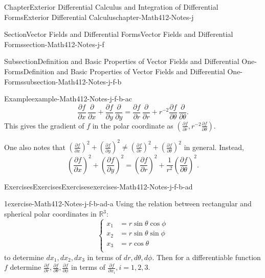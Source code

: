 \documentclass[oneside,10pt,]{book}
\numberwithin{equation}{section}
\newcommand{\bbR}{\mathbb{R}}
\newcommand{\amp}{&}
\begin{document}
\begin{chapterptx}{Chapter}{Exterior Differential Calculus and Integration of Differential Forms}{}{Exterior Differential Calculus}{}{}{chapter-Math412-Notes-j}
\begin{sectionptx}{Section}{Vector Fields and Differential Forms}{}{Vector Fields and Differential Forms}{}{}{section-Math412-Notes-j-f}
\begin{subsectionptx}{Subsection}{Definition and Basic Properties of Vector Fields and Differential One-Forms}{}{Definition and Basic Properties of Vector Fields and Differential One-Forms}{}{}{subsection-Math412-Notes-j-f-b}
\begin{example}{Example}{}{example-Math412-Notes-j-f-b-ac}
\begin{equation*}
\frac{\partial f}{\partial x}\, \frac{\partial }{\partial x} + \frac{\partial f}{\partial y}\, \frac{\partial }{\partial y}
= \frac{\partial f}{\partial r}\, \frac{\partial }{\partial r} + r^{-2} \frac{\partial f}{\partial \theta}\, 
\frac{\partial }{\partial \theta}.
\end{equation*}
This gives the gradient of \(f\) in the polar coordinate as \((\frac{\partial f}{\partial r},  r^{-2} \frac{\partial f}{\partial \theta})\).%
\par
One also notes that \(\left(\frac{\partial f}{\partial x}\right)^{2}+\left(\frac{\partial f}{\partial y}\right)^{2}
\ne \left(\frac{\partial f}{\partial r}\right)^{2}+\left(\frac{\partial f}{\partial \theta}\right)^{2}\) in general. Instead,%
\begin{equation*}
\left(\frac{\partial f}{\partial x}\right)^{2}+\left(\frac{\partial f}{\partial y}\right)^{2}
= \left(\frac{\partial f}{\partial r}\right)^{2}+\frac{1}{r^{2}}\left(\frac{\partial f}{\partial \theta}\right)^{2}\text{.}
\end{equation*}
%
\end{example}
%
%
\typeout{************************************************}
\typeout{************************************************}
%
\begin{exercises-subsubsection-numberless}{Exercises}{Exercises}{}{Exercises}{}{}{exercises-Math412-Notes-j-f-b-ad}
\begin{divisionexercise}{1}{}{}{exercise-Math412-Notes-j-f-b-ad-a}%
Using the relation between rectangular and spherical polar coordinates in \(\bbR^{3}\):%
\begin{equation*}
\begin{cases} x_{1} \amp = r\sin\theta\cos\phi \\
x_{2} \amp = r \sin\theta\sin\phi \\
x_{3} \amp = r \cos\theta\\
\end{cases}
\end{equation*}
to determine \(dx_{1}, dx_{2}, dx_{3}\) in terms of \(dr, d\theta, d\phi\).  Then for a differentiable function \(f\) determine \(\frac{\partial f}{\partial r}, \frac{\partial f}{\partial \theta}, \frac{\partial f}{\partial \phi}\) in terms of \(\frac{\partial f}{\partial x_{i}}, i=1, 2, 3\).%
\par\smallskip%

\end{divisionexercise}
\end{exercises-subsubsection-numberless}
\end{subsectionptx}
\end{sectionptx}
\end{chapterptx}
\end{document}
